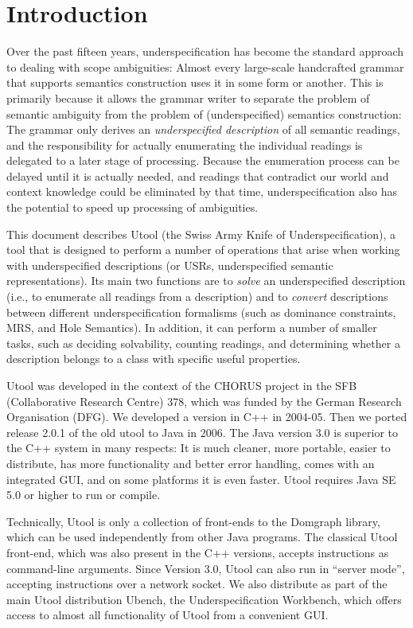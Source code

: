 
\section{Introduction}  \label{sec:introduction}

Over the past fifteen years, underspecification has become the
standard approach to dealing with scope ambiguities: Almost every
large-scale handcrafted grammar that supports semantics construction
uses it in some form or another. This is primarily because it allows
the grammar writer to separate the problem of semantic ambiguity from
the problem of (underspecified) semantics construction: The grammar
only derives an \emph{underspecified description} of all semantic
readings, and the responsibility for actually enumerating the
individual readings is delegated to a later stage of
processing. Because the enumeration process can be delayed until it is
actually needed, and readings that contradict our world and context
knowledge could be eliminated by that time, underspecification also
has the potential to speed up processing of ambiguities.

This document describes Utool (the Swiss Army Knife of
Underspecification), a tool that is designed to perform a number of
operations that arise when working with underspecified descriptions
(or USRs, underspecified semantic representations). Its main two
functions are to \emph{solve} an underspecified description (i.e., to
enumerate all readings from a description) and to \emph{convert}
descriptions between different underspecification formalisms (such as
dominance constraints, MRS, and Hole Semantics). In addition, it can
perform a number of smaller tasks, such as deciding solvability,
counting readings, and determining whether a description belongs to a
class with specific useful properties.

Utool was developed in the context of the CHORUS project in the SFB
(Collaborative Research Centre) 378, which was funded by the German
Research Organisation (DFG). We developed a version in C++ in
2004-05. Then we ported release 2.0.1 of the old utool to Java in
2006. The Java version 3.0 is superior to the C++ system in many
respects: It is much cleaner, more portable, easier to distribute, has
more functionality and better error handling, comes with an integrated
GUI, and on some platforms it is even faster. Utool requires Java SE
5.0 or higher to run or compile.

Technically, Utool is only a collection of front-ends to the Domgraph
library, which can be used independently from other Java programs. The
classical Utool front-end, which was also present in the C++ versions,
accepts instructions as command-line arguments. Since Version 3.0,
Utool can also run in ``server mode'', accepting instructions over a
network socket. We also distribute as part of the main Utool
distribution Ubench, the Underspecification Workbench, which offers
access to almost all functionality of Utool from a convenient
GUI. 

